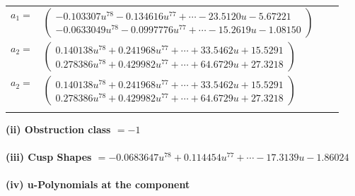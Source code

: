 \documentclass[1p]{elsarticle_modified}
\theoremstyle{definition}
\begin{document}
\begin{tabular}{m{7pt} m{180pt} m{7pt} m{180pt} }
\flushright $a_{1}=$&$\begin{pmatrix}-0.103307 u^{78}-0.134616 u^{77}+\cdots-23.5120 u-5.67221\\-0.0633049 u^{78}-0.0997776 u^{77}+\cdots-15.2619 u-1.08150\end{pmatrix}$ \\
\flushright $a_{2}=$&$\begin{pmatrix}0.140138 u^{78}+0.241968 u^{77}+\cdots+33.5462 u+15.5291\\0.278386 u^{78}+0.429982 u^{77}+\cdots+64.6729 u+27.3218\end{pmatrix}$\\ \flushright $a_{2}=$&$\begin{pmatrix}0.140138 u^{78}+0.241968 u^{77}+\cdots+33.5462 u+15.5291\\0.278386 u^{78}+0.429982 u^{77}+\cdots+64.6729 u+27.3218\end{pmatrix}$\\&\end{tabular}
\flushleft \textbf{(ii) Obstruction class $= -1$}\\~\\
\flushleft \textbf{(iii) Cusp Shapes $= -0.0683647 u^{78}+0.114454 u^{77}+\cdots-17.3139 u-1.86024$}\\~\\
\newpage\renewcommand{\arraystretch}{1}
\flushleft \textbf{(iv) u-Polynomials at the component}\newline \\
\end{document}
